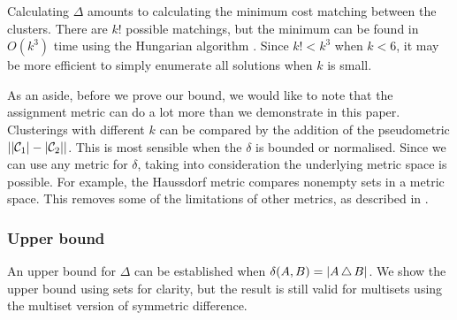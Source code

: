Calculating $\Delta$ amounts to calculating the minimum cost matching between
the clusters.  There are $k!$ possible matchings, but the minimum can be found
in $O(k^3)$ time using the Hungarian algorithm \cite{kuhn1955hungarian}.
Since $k! < k^3$ when $k < 6$, it may be more efficient to simply enumerate
all solutions when $k$ is small.

As an aside, before we prove our bound, we would like to note that the
assignment metric can do a lot more than we demonstrate in this paper.
Clusterings with different $k$ can be compared by the addition of the
pseudometric $||\mathcal{C}_1|-|\mathcal{C}_2||$.  This is most sensible when the $\delta$
is bounded or normalised.  Since we can use any metric for $\delta$, taking
into consideration the underlying metric space is possible.  For example, the
Haussdorf metric compares nonempty sets in a metric space.  This removes some
of the limitations of other metrics, as described in
\citep{bae2010comparison}.

\subsubsection{Upper bound}
\label{sec:upper-bound}

An upper bound for $\Delta$ can be established when $\delta(A,B) = |A \operatorname{\bigtriangleup}
B|$.  We show the upper bound using sets for clarity, but the result is still
valid for multisets using the multiset version of symmetric difference.

